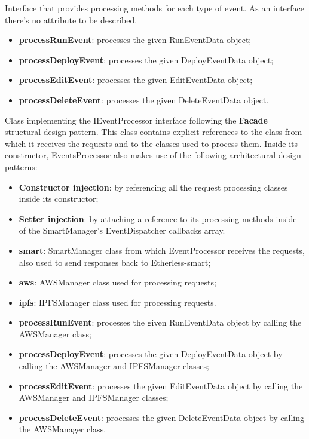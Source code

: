 	Interface that provides processing methods for each type of event.
	As an interface there's no attribute to be described.
	\begin{itemize}
		\item \textbf{processRunEvent}: processes the given RunEventData object;
		\item \textbf{processDeployEvent}: processes the given DeployEventData object;
		\item \textbf{processEditEvent}: processes the given EditEventData object;
		\item \textbf{processDeleteEvent}: processes the given DeleteEventData object.
	\end{itemize}
	Class implementing the IEventProcessor interface following the \textbf{Facade} structural design pattern. This class contains explicit references to the class from which it receives the requests and to the classes used to process them. Inside its constructor, EventsProcessor also makes use of the following architectural design patterns:
	\begin{itemize}
		\item \textbf{Constructor injection}: by referencing all the request processing classes inside its constructor;
		\item \textbf{Setter injection}: by attaching a reference to its processing methods inside of the SmartManager's EventDispatcher callbacks array.
	\end{itemize}
	\begin{itemize}
		\item \textbf{smart}: SmartManager class from which EventProcessor receives the requests, also used to send responses back to Etherless-smart;
		\item \textbf{aws}: AWSManager class used for processing requests;
		\item \textbf{ipfs}: IPFSManager class used for processing requests.
	\end{itemize}
	\begin{itemize}
		\item \textbf{processRunEvent}: processes the given RunEventData object by calling the AWSManager class;
		\item \textbf{processDeployEvent}: processes the given DeployEventData object by calling the AWSManager and IPFSManager classes;
		\item \textbf{processEditEvent}: processes the given EditEventData object by calling the AWSManager and IPFSManager classes;
		\item \textbf{processDeleteEvent}: processes the given DeleteEventData object by calling the AWSManager class.
	\end{itemize}
